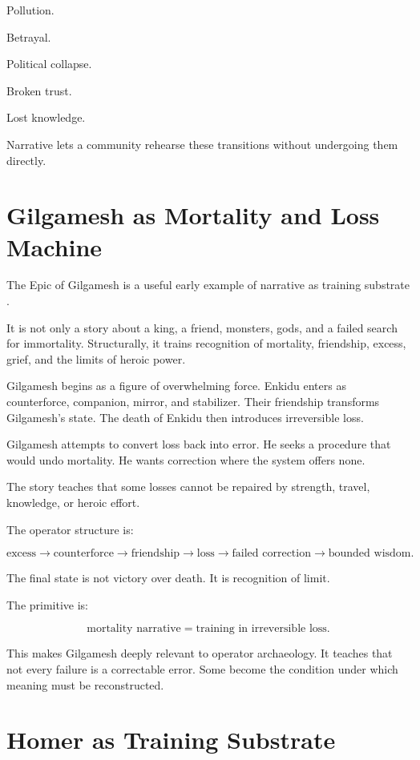 \documentclass[11pt]{book}
\begin{document}
Pollution.

Betrayal.

Political collapse.

Broken trust.

Lost knowledge.

Narrative lets a community rehearse these transitions without undergoing them directly.

\section{Gilgamesh as Mortality and Loss Machine}

The Epic of Gilgamesh is a useful early example of narrative as training substrate \cite{George2003Gilgamesh,Dalley2000MythsMesopotamia}.

It is not only a story about a king, a friend, monsters, gods, and a failed search for immortality. Structurally, it trains recognition of mortality, friendship, excess, grief, and the limits of heroic power.

Gilgamesh begins as a figure of overwhelming force. Enkidu enters as counterforce, companion, mirror, and stabilizer. Their friendship transforms Gilgamesh's state. The death of Enkidu then introduces irreversible loss.

Gilgamesh attempts to convert loss back into error. He seeks a procedure that would undo mortality. He wants correction where the system offers none.

The story teaches that some losses cannot be repaired by strength, travel, knowledge, or heroic effort.

The operator structure is:

\[
\text{excess}
\rightarrow
\text{counterforce}
\rightarrow
\text{friendship}
\rightarrow
\text{loss}
\rightarrow
\text{failed correction}
\rightarrow
\text{bounded wisdom}.
\]

The final state is not victory over death. It is recognition of limit.

The primitive is:

\[
\text{mortality narrative} = \text{training in irreversible loss}.
\]

This makes Gilgamesh deeply relevant to operator archaeology. It teaches that not every failure is a correctable error. Some become the condition under which meaning must be reconstructed.

\section{Homer as Training Substrate}
\end{document}
